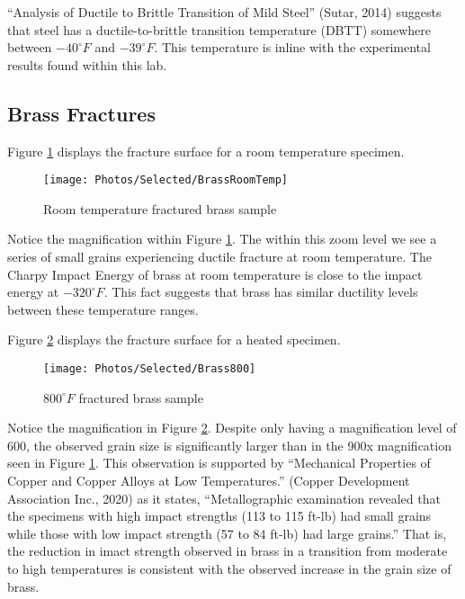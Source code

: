 \documentclass{article}
\begin{document}
“Analysis of Ductile to Brittle Transition of Mild Steel” (Sutar, 2014) suggests that steel has a ductile-to-brittle transition temperature (DBTT) somewhere between $-40^\circ F$ and $-39^\circ F$. This temperature is inline with the experimental results found within this lab.

\subsection{Brass Fractures}

Figure \ref{fig:BrassRoomTemp} displays the fracture surface for a room temperature specimen.

\begin{figure}[H]
\centering
\texttt{[image: Photos/Selected/BrassRoomTemp]}
\caption{Room temperature fractured brass sample}
\label{fig:BrassRoomTemp}
\end{figure}

Notice the magnification within Figure \ref{fig:BrassRoomTemp}. The within this zoom level we see a series of small grains experiencing ductile fracture at room temperature. The Charpy Impact Energy of brass at room temperature is close to the impact energy at $-320^\circ F$. This fact suggests that brass has similar ductility levels between these temperature ranges.

Figure \ref{fig:Brass800} displays the fracture surface for a heated specimen.

\begin{figure}[H]
\centering
\texttt{[image: Photos/Selected/Brass800]}
\caption{$800^\circ F$ fractured brass sample}
\label{fig:Brass800}
\end{figure}

Notice the magnification in Figure \ref{fig:Brass800}. Despite only having a magnification level of 600, the observed grain size is significantly larger than in the 900x magnification seen in Figure \ref{fig:BrassRoomTemp}. This observation is supported by “Mechanical Properties of Copper and Copper Alloys at Low Temperatures.” (Copper Development Association Inc., 2020) as it states, ``Metallographic examination revealed that the specimens with high impact strengths (113 to 115 ft-lb) had small grains while those with low impact strength (57 to 84 ft-lb) had large grains.'' That is, the reduction in imact strength observed in brass in a transition from moderate to high temperatures is consistent with the observed increase in the grain size of brass.
\end{document}
